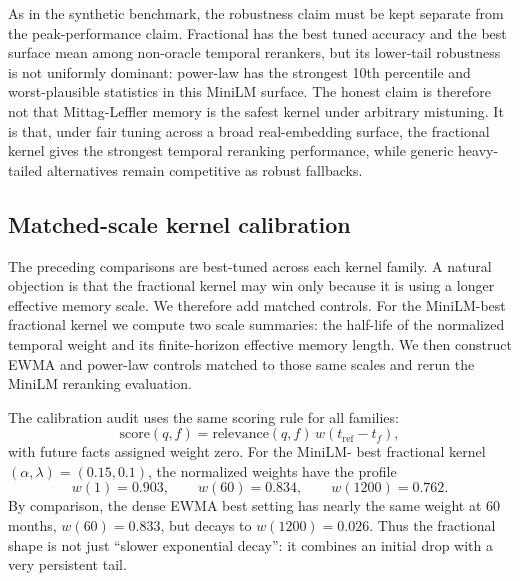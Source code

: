 \documentclass[11pt]{article}
\theoremstyle{plain}
\theoremstyle{definition}
\begin{document}
As in the synthetic benchmark, the robustness claim must be
kept separate from the peak-performance claim.  Fractional
has the best tuned accuracy and the best surface mean among
non-oracle temporal rerankers, but its lower-tail robustness
is not uniformly dominant: power-law has the strongest 10th
percentile and worst-plausible statistics in this MiniLM
surface.  The honest claim is therefore not that
Mittag-Leffler memory is the safest kernel under arbitrary
mistuning.  It is that, under fair tuning across a broad
real-embedding surface, the fractional kernel gives the
strongest temporal reranking performance, while generic
heavy-tailed alternatives remain competitive as robust
fallbacks.
\subsection{Matched-scale kernel calibration}
\label{sec:kernel_calibration}

The preceding comparisons are best-tuned across each
kernel family.  A natural objection is that the fractional
kernel may win only because it is using a longer effective
memory scale.  We therefore add matched controls.  For the
MiniLM-best fractional kernel we compute two scale
summaries: the half-life of the normalized temporal weight
and its finite-horizon effective memory length.  We then
construct EWMA and power-law controls matched to those
same scales and rerun the MiniLM reranking evaluation.

The calibration audit uses the same scoring rule for all
families:
\[
  \mathrm{score}(q,f)
  = \mathrm{relevance}(q,f)\,w(t_{\mathrm{ref}}-t_f),
\]
with future facts assigned weight zero.  For the MiniLM-
best fractional kernel $(\alpha,\lambda)=(0.15,0.1)$,
the normalized weights have the profile
\[
  w(1)=0.903,\qquad w(60)=0.834,
  \qquad w(1200)=0.762.
\]
By comparison, the dense EWMA best setting has nearly the
same weight at $60$ months, $w(60)=0.833$, but decays to
$w(1200)=0.026$.  Thus the fractional shape is not just
``slower exponential decay'': it combines an initial drop
with a very persistent tail.
\end{document}

